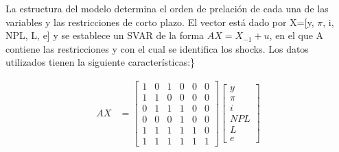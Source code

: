 \documentclass[
]{book}
\begin{document}
La estructura del modelo determina el orden de prelación de cada una de las variables y las restricciones de corto plazo.
El vector está dado por X={[}y, \(\pi\), i, NPL, L, e{]} y se establece un SVAR de la forma \(AX=X_{-1}+u\), en el que A contiene las restricciones y con el cual se identifica los shocks.
Los datos utilizados tienen la siguiente características:\}

\begin{eqnarray}
AX&=\begin{bmatrix}
1 & 0 & 1 & 0 & 0 & 0  \\
1 & 1 & 0 & 0 & 0 & 0 \\
0 & 1 & 1 & 1 & 0 & 0 \\
0 & 0 & 0 & 1 & 0 & 0 \\
1 & 1 & 1 & 1 & 1 & 0 \\
1 & 1 & 1 & 1 & 1 & 1 \end{bmatrix}
\begin{bmatrix}
y \\
\pi \\
i\\
NPL\\
L\\
e\end{bmatrix}
\end{eqnarray}

  
\end{document}
